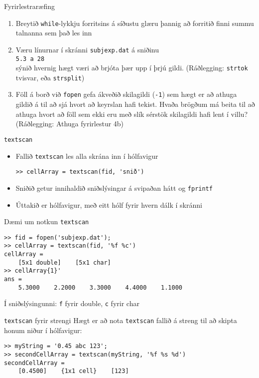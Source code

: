 \documentclass{beamer}
\begin{document}
\begin{frame}[fragile]{Fyrirlestraræfing}
\vspace{\baselineskip}
\begin{enumerate}
 \item Breytið \texttt{while}-lykkju forritsins á síðustu glæru þannig að forritið finni summu talnanna sem það les inn
 \item Væru línurnar í skránni \texttt{subjexp.dat} á sniðinu\\
 \verb|5.3 a 28|\\
 sýnið hvernig hægt væri að brjóta þær upp í þrjú gildi. (Ráðlegging: \texttt{strtok} tvisvar, eða \texttt{strsplit})
 \item Föll á borð við \texttt{fopen} gefa ákveðið skilagildi (\texttt{-1}) sem hægt er að athuga gildið á til að sjá hvort að keyrslan hafi tekist. Hvaða brögðum má beita til að athuga hvort að föll sem ekki eru með slík sérstök skilagildi hafi lent í villu? (Ráðlegging: Athuga fyrirlestur 4b)
\end{enumerate}
\end{frame}

\begin{frame}[fragile]{\texttt{textscan}}
\begin{itemize}
 \item Fallið \texttt{textscan} les alla skrána inn í hólfavigur
\begin{verbatim}
>> cellArray = textscan(fid, 'snið')
\end{verbatim}
 \item Sniðið getur innihaldið sniðslýsingar á svipaðan hátt og \texttt{fprintf}
 \item Úttakið er hólfavigur, með eitt hólf fyrir hvern dálk í skránni
\end{itemize}
\end{frame}

\begin{frame}[fragile]{Dæmi um notkun \texttt{textscan}}
\begin{verbatim}
>> fid = fopen('subjexp.dat');
>> cellArray = textscan(fid, '%f %c')
cellArray = 
    [5x1 double]    [5x1 char]
>> cellArray{1}'
ans =
    5.3000    2.2000    3.3000    4.4000    1.1000
\end{verbatim}
Í sniðslýsingunni: \texttt{f} fyrir double, \texttt{c} fyrir char
\end{frame}

\begin{frame}[fragile]{\texttt{textscan} fyrir strengi}
Hægt er að nota \texttt{textscan} fallið á streng til að skipta honum niður í hólfavigur:
\begin{verbatim}
>> myString = '0.45 abc 123';
>> secondCellArray = textscan(myString, '%f %s %d')
secondCellArray = 
    [0.4500]    {1x1 cell}    [123]
\end{verbatim}
\end{frame}
\end{document}
